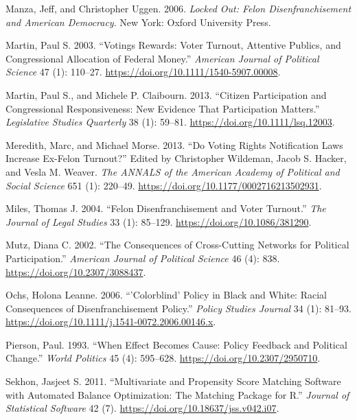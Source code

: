 \documentclass[12pt,]{article}
\begin{document}
\leavevmode\hypertarget{ref-locked_out}{}%
Manza, Jeff, and Christopher Uggen. 2006. \emph{Locked Out: Felon Disenfranchisement and American Democracy}. New York: Oxford University Press.

\leavevmode\hypertarget{ref-Martin2003}{}%
Martin, Paul S. 2003. ``Votings Rewards: Voter Turnout, Attentive Publics, and Congressional Allocation of Federal Money.'' \emph{American Journal of Political Science} 47 (1): 110--27. \url{https://doi.org/10.1111/1540-5907.00008}.

\leavevmode\hypertarget{ref-Martin2013}{}%
Martin, Paul S., and Michele P. Claibourn. 2013. ``Citizen Participation and Congressional Responsiveness: New Evidence That Participation Matters.'' \emph{Legislative Studies Quarterly} 38 (1): 59--81. \url{https://doi.org/10.1111/lsq.12003}.

\leavevmode\hypertarget{ref-Meredith2013}{}%
Meredith, Marc, and Michael Morse. 2013. ``Do Voting Rights Notification Laws Increase Ex-Felon Turnout?'' Edited by Christopher Wildeman, Jacob S. Hacker, and Vesla M. Weaver. \emph{The ANNALS of the American Academy of Political and Social Science} 651 (1): 220--49. \url{https://doi.org/10.1177/0002716213502931}.

\leavevmode\hypertarget{ref-Miles2004}{}%
Miles, Thomas J. 2004. ``Felon Disenfranchisement and Voter Turnout.'' \emph{The Journal of Legal Studies} 33 (1): 85--129. \url{https://doi.org/10.1086/381290}.

\leavevmode\hypertarget{ref-Mutz2002}{}%
Mutz, Diana C. 2002. ``The Consequences of Cross-Cutting Networks for Political Participation.'' \emph{American Journal of Political Science} 46 (4): 838. \url{https://doi.org/10.2307/3088437}.

\leavevmode\hypertarget{ref-Ochs2006}{}%
Ochs, Holona Leanne. 2006. ``'Colorblind' Policy in Black and White: Racial Consequences of Disenfranchisement Policy.'' \emph{Policy Studies Journal} 34 (1): 81--93. \url{https://doi.org/10.1111/j.1541-0072.2006.00146.x}.

\leavevmode\hypertarget{ref-Pierson1993}{}%
Pierson, Paul. 1993. ``When Effect Becomes Cause: Policy Feedback and Political Change.'' \emph{World Politics} 45 (4): 595--628. \url{https://doi.org/10.2307/2950710}.

\leavevmode\hypertarget{ref-Sekhon2011}{}%
Sekhon, Jasjeet S. 2011. ``Multivariate and Propensity Score Matching Software with Automated Balance Optimization: The Matching Package for R.'' \emph{Journal of Statistical Software} 42 (7). \url{https://doi.org/10.18637/jss.v042.i07}.
\end{document}
